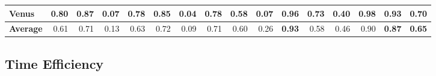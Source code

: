 \begin{table*}[th]
\begin{tabular}{|l|r|r|r|r|r|r|r|r|r|r|r|r|r|r|r|}
\hline
     Venus &      0.80  &      0.87  &      0.07  &      0.78  &      0.85  &      0.04  &      0.78  &      0.58  &      0.07  &      0.96  &      0.73  &      0.40  & {\bf 0.98 } & {\bf 0.93 } & {\bf 0.70 } \\
\hline
{\bf Average} &      0.61  &      0.71  &      0.13  &      0.63  &      0.72  &      0.09  &      0.71  &      0.60  &      0.26  & {\bf 0.93 } &      0.58  &      0.46  &      0.90  & {\bf 0.87 } & {\bf 0.65 } \\
\hline
\end{tabular}
\label{tab:end2end}
\end{table*}


\subsection{Time Efficiency}

